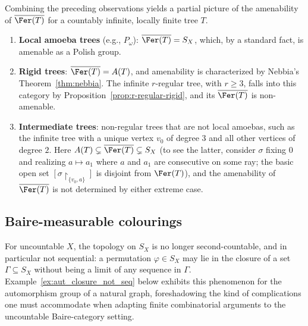 Combining the preceding observations yields a partial picture of the amenability of $\overline{\Fer(T)}$ for a countably infinite, locally finite tree $T$.
\begin{enumerate}
    \item \textbf{Local amoeba trees} (e.g., $P_\omega$): $\overline{\Fer(T)}=S_X$, which, by a standard fact, is amenable as a Polish group.
    \item \textbf{Rigid trees}: $\overline{\Fer(T)}=A(T)$, and amenability is characterized by Nebbia's Theorem~\ref{thm:nebbia}.
    The infinite $r$-regular tree, with $r\geq 3$, falls into this category by Proposition~\ref{prop:r-regular-rigid}, and its $\overline{\Fer(T)}$ is non-amenable.
    \item \textbf{Intermediate trees}: non-regular trees that are not local amoebas, such as the infinite tree with a unique vertex $v_0$ of degree $3$ and all other vertices of degree $2$.
    Here $A(T)\subsetneq\overline{\Fer(T)}\subsetneq S_X$ (to see the latter, consider $\sigma$ fixing $0$ and realizing $a\mapsto a_1$ where $a$ and $a_1$ are consecutive on some ray; the basic open set $[\sigma\restriction_{\{v_0,a\}}]$ is disjoint from $\Fer(T)$), and the amenability of $\overline{\Fer(T)}$ is not determined by either extreme case.
\end{enumerate}

\subsection{Baire-measurable colourings}\label{subsec:baire_measurable}

For uncountable $X$, the topology on $S_X$ is no longer second-countable, and in particular not sequential: a permutation $\varphi\in S_X$ may lie in the closure of a set $\Gamma\subseteq S_X$ without being a limit of any sequence in $\Gamma$.
Example~\ref{ex:aut_closure_not_seq} below exhibits this phenomenon for the automorphism group of a natural graph, foreshadowing the kind of complications one must accommodate when adapting finite combinatorial arguments to the uncountable Baire-category setting.

